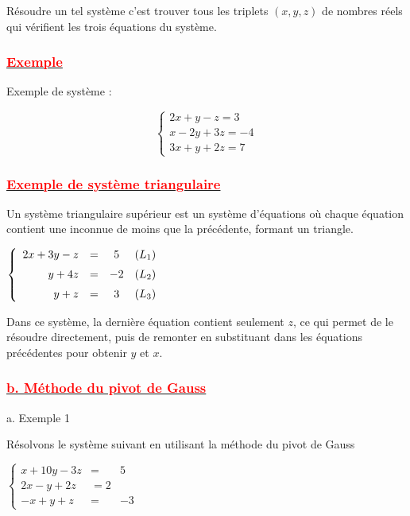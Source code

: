 \documentclass[12pt,a4paper]{article}
\begin{document}
Résoudre un tel système c’est trouver tous les triplets \((x, y, z)\) de nombres réels qui vérifient les trois équations du système.

\subsubsection*{\underline{\textbf{\textcolor{red}{ Exemple }}}}

Exemple de système :

\[
\begin{cases}
2x + y - z = 3 \\
x - 2y + 3z = -4 \\
3x + y + 2z = 7
\end{cases}
\]

\subsubsection*{\underline{\textbf{\textcolor{red}{Exemple de système triangulaire}}}}

Un système triangulaire supérieur est un système d'équations où chaque équation contient une inconnue de moins que la précédente, formant un triangle.

$
\left\{
\begin{array}{rcc l}
2x + 3y - z & = & 5 & (L_1) \\[2mm]
y + 4z & = & -2 & (L_2) \\[2mm]
y + z & = & 3 & (L_3)
\end{array}
\right.
$

Dans ce système, la dernière équation contient seulement \( z \), ce qui permet de le résoudre directement, puis de remonter en substituant dans les équations précédentes pour obtenir \( y \) et \( x \).

\subsubsection*{\underline{\textbf{\textcolor{red}{b. Méthode du pivot de Gauss }}}}

a. Exemple 1

	Résolvons le système suivant en utilisant la méthode du pivot de Gauss

	$\left\lbrace\begin{array}{lcl}x+10y-3z& =&5\\2x-y+2z& = 2\\-x+y+z& =& -3\end{array}\right.$
\end{document}
